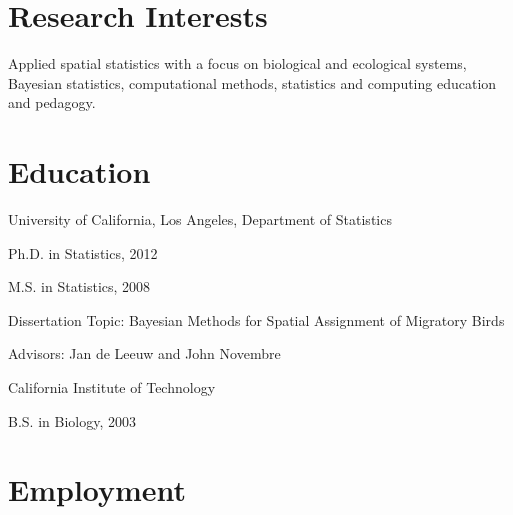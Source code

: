 \documentclass[margin,line]{res}
\begin{document}
\address{
204 Old Chemistry Building $\bullet$ Dept of Statistical Science, Duke University  
}

\begin{resume}

%

\vspace{3mm}

\section{\sc Research Interests}
Applied spatial statistics with a focus on biological and ecological systems, Bayesian statistics, computational methods, statistics and computing education and pedagogy.

\vspace{4mm}

%

\section{\sc Education}
University of California, Los Angeles, Department of Statistics
\vspace{1mm}
\begin{list1}
\item[] Ph.D. in Statistics,  2012
\item[] M.S. in Statistics,  2008
\vspace{1mm}
\item[] Dissertation Topic:  Bayesian Methods for Spatial Assignment of Migratory Birds
\item[] Advisors:  Jan de Leeuw and John Novembre
\end{list1}

\vspace{-0.13cm}
California Institute of Technology
\vspace{1mm}
\begin{list1}
\item[] B.S. in Biology, 2003
\end{list1}


%

\section{\sc Employment}


\end{resume}
\end{document}

